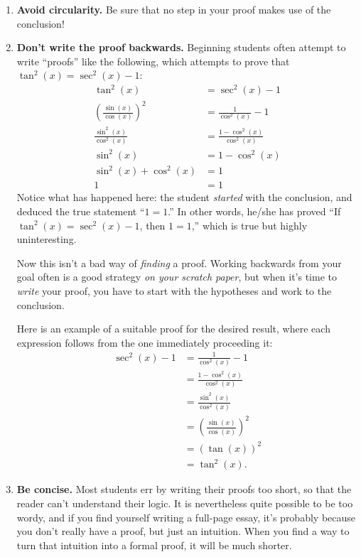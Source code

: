 \begin{enumerate}
\item \textbf{Avoid circularity.}  Be sure that no step in your proof makes use of the conclusion!
        
\item \textbf{Don't write the proof backwards.}
        Beginning students often attempt to write ``proofs'' like the following, which attempts to prove that $\tan^2(x)  = \sec^2(x) - 1$:
\begin{align*}
 \tan^2(x) & = \sec^2(x) - 1 \\
\left(\frac{\sin(x)}{\cos(x)}\right)^2 & = \frac{1}{\cos^2(x)} - 1 \\
\frac{\sin^2(x)}{\cos^2(x)} & =  \frac{1-\cos^2(x)}{\cos^2(x)} \\
\sin^2(x) & = 1-\cos^2(x) \\
\sin^2(x) + \cos^2(x) & = 1 \\
1 & = 1
\end{align*}        
        Notice what has happened here:  the student \emph{started} with the conclusion,
        and deduced the true statement ``$1=1$.''
        In other words, he/she has proved ``If $\tan^2(x) = \sec^2(x) - 1$, then $1=1$,''
        which is true but highly uninteresting.
        
        Now this isn't a bad way of \emph{finding} a proof.
        Working backwards from your goal often is a good strategy \emph{on your scratch paper},
        but when it's time to \emph{write} your proof,
        you have to start with the hypotheses and work to the conclusion.

Here is an example of a suitable proof for the desired result, where each expression follows from the one immediately proceeding it:
\begin{align*}
\sec^2(x) - 1 & = \frac{1}{\cos^2(x)} - 1\\
& = \frac{1-\cos^2(x)}{\cos^2(x)} \\
& = \frac{\sin^2(x)}{\cos^2(x)} \\
& = \left(\frac{\sin(x)}{\cos(x)}\right)^2 \\
& = \left(\tan(x)\right)^2 \\
& = \tan^2(x).
\end{align*}

\item \textbf{Be concise.}
        Most students err by writing their proofs too short,
        so that the reader can't understand their logic.
        It is nevertheless quite possible to be too wordy,
        and if you find yourself writing a full-page essay,
        it's probably because you don't really have a proof,
        but just an intuition.
        When you find a way to turn that intuition into a formal proof,
        it will be much shorter.


\end{enumerate}
